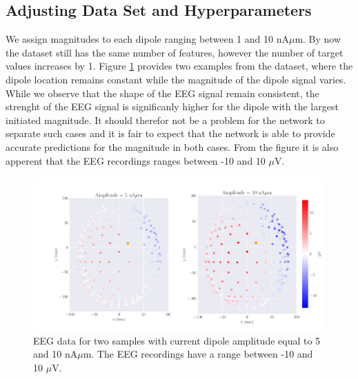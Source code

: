 \documentclass[a4paper, UKenglish, 11pt]{uiomaster}
\begin{document}
\subsection{Adjusting Data Set and Hyperparameters}
We assign magnitudes to each dipole ranging between 1 and 10 nA$\mu$m. By now the dataset still has the same number of features, however the number of target values increases by 1. Figure \ref{fig:dipole_w_amplitude_example} provides two examples from the dataset, where the dipole location remains constant while the magnitude of the dipole signal varies. While we observe that the shape of the EEG signal remain consistent, the strenght of the EEG signal is significanly higher for the dipole with the largest initiated magnitude. It should therefor not be a problem for the network to separate such cases and it is fair to expect that the network is able to provide accurate predictions for the magnitude in both cases. From the figure it is also apperent that the EEG recordings ranges between -10 and 10 $\mu$V. 

\begin{figure}[!htb]
    \centering
    \includegraphics[width=\linewidth]{figures/dipole_w_amplitude_example.pdf}
    \caption{EEG data for two samples with current dipole amplitude equal to 5 and 10 nA$\mu$m. The EEG recordings have a range between -10 and 10 $\mu$V.}
    \label{fig:dipole_w_amplitude_example}
\end{figure}
\end{document}

